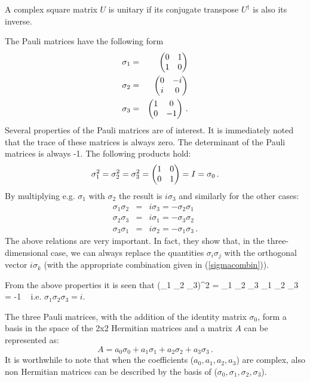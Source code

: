  A complex square matrix $U$ is unitary if its conjugate transpose $U^\dag$ is also its inverse.
 
 The Pauli matrices have the following form
%
\begin{eqnarray}
\sigma_1 &= & \begin{pmatrix}0 & 1\cr 1 & 0\end{pmatrix} \nonumber \\
%
\sigma_2 &= & \begin{pmatrix}0 & -i\cr i & 0\end{pmatrix} \nonumber \\
%
\sigma_3 &= &\begin{pmatrix}1 & 0\cr 0 & -1\end{pmatrix}  \, .
%
\end{eqnarray}
%
Several properties of the Pauli matrices are of interest.
It is immediately noted that the trace of these matrices is always zero. The determinant of the Pauli matrices is always -1.
The following products hold: 
%
\begin {equation}
\sigma_1^2 = \sigma_2^2 = \sigma_3^2 =  \begin{pmatrix}1 & 0\cr 0 & 1\end{pmatrix} = I = \sigma_0\,.
 \end{equation}
By multiplying e.g. $\sigma_1$ with $\sigma_2$ the result is $i \sigma_3$ and similarly for the other cases:
%
\begin {eqnarray}
\sigma_1 \sigma_2 &=& i \sigma_3  = - \sigma_2 \sigma_1 \nonumber \\
\sigma_2 \sigma_3 &=& i \sigma_1 =  - \sigma_3  \sigma_2\nonumber \\
\sigma_3 \sigma_1 &=&  i \sigma_2 =  - \sigma_1  \sigma_3 \,.
\label{sigmacombin}
 \end{eqnarray}
 The above relations are very important. In fact, they show that, in the three-dimensional case, we can always replace the quantities $\sigma_i\sigma_j$ with the orthogonal vector $i \sigma_k$ (with the appropriate combination given in (\ref{sigmacombin})).
 
 From the above properties it is seen that
 \be\label{i123}
 (\sigma_1 \sigma_2 \sigma_3)^2 =  \sigma_1 \sigma_2 \sigma_3 \sigma_1 \sigma_2 \sigma_3 = -1 \
 \ee
i.e. $ \sigma_1 \sigma_2 \sigma_3 = i$.
 
The three Pauli matrices, with the addition of the identity matrix $\sigma_0$, form a basis in the space of the 2x2  Hermitian matrices and a matrix $A$ can be represented as:
%
\begin {equation}
A = a_0\sigma_0 + a_1 \sigma_1 + a_2 \sigma_2 + a_3 \sigma_3\,.
 \end{equation}
It is worthwhile to note that when the coefficients ($a_0,a_1,a_2,a_3$) are complex, also non Hermitian matrices can be described by the basis of ($\sigma_0,\sigma_1,\sigma_2, \sigma_3$).

